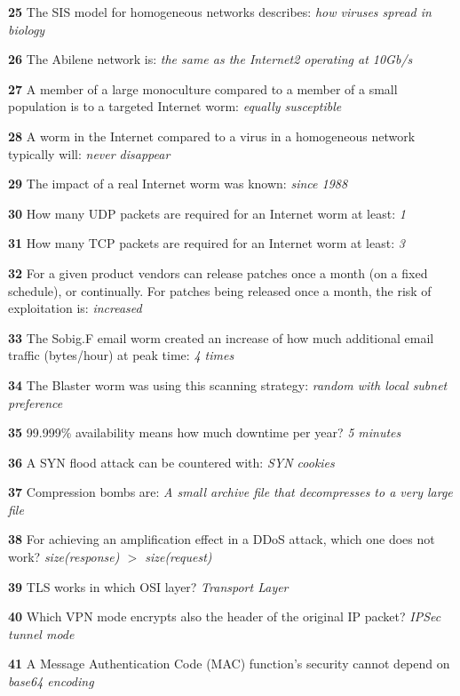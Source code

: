 \textbf{  25}  The SIS model for homogeneous networks describes:  
\textit{ how viruses spread in biology}

\textbf{  26}  The Abilene network is:  
\textit{ the same as the Internet2 operating at 10Gb/s}

\textbf{  27}  A member of a large monoculture compared to a member of a small population is to a targeted Internet worm:  
\textit{ equally susceptible}

\textbf{  28}  A worm in the Internet compared to a virus in a homogeneous network typically will:  
\textit{ never disappear}

\textbf{  29}  The impact of a real Internet worm was known:  
\textit{ since 1988}

\textbf{  30}  How many UDP packets are required for an Internet worm at least:  
\textit{ 1}

\textbf{  31}  How many TCP packets are required for an Internet worm at least:  
\textit{ 3}

\textbf{  32}  For a given product vendors can release patches once a month (on a fixed schedule), or continually. For patches being released once a month, the risk of exploitation is: 
\textit{ increased}

\textbf{  33}  The Sobig.F email worm created an increase of how much additional email traffic (bytes/hour) at peak time: 
\textit{ 4 times}

\textbf{  34}  The Blaster worm was using this scanning strategy:  
\textit{ random with local subnet preference}

\textbf{  35}  99.999\% availability means how much downtime per year?  
\textit{ 5 minutes}

\textbf{  36}  A SYN flood attack can be countered with:  
\textit{ SYN cookies}

\textbf{  37}  Compression bombs are:  
\textit{ A small archive file that decompresses to a very large file}

\textbf{  38}  For achieving an amplification effect in a DDoS attack, which one does not work?  
\textit{ size(response) $>$ size(request)}

\textbf{  39}  TLS works in which OSI layer?  
\textit{ Transport Layer}

\textbf{  40}  Which VPN mode encrypts also the header of the original IP packet?  
\textit{ IPSec tunnel mode}

\textbf{  41}  A Message Authentication Code (MAC) function's security cannot depend on  
\textit{ base64 encoding}

